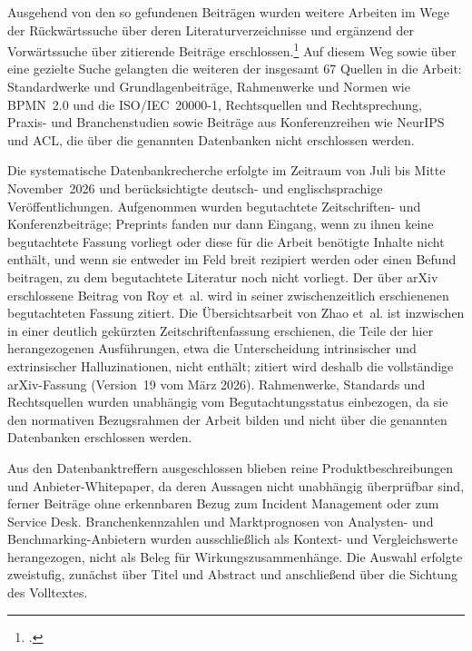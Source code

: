 Ausgehend von den so gefundenen Beitr\"agen wurden weitere Arbeiten im Wege der R\"uckw\"artssuche \"uber deren Literaturverzeichnisse und erg\"anzend der Vorw\"artssuche \"uber zitierende Beitr\"age erschlossen.\footcites[Vgl.][S.~xvi]{Webster2002}[][o.~S.]{VomBrocke2009} Auf diesem Weg sowie \"uber eine gezielte Suche gelangten die weiteren der insgesamt 67 Quellen in die Arbeit: Standardwerke und Grundlagenbeitr\"age, Rahmenwerke und Normen wie BPMN~2.0 und die ISO/IEC~20000-1, Rechtsquellen und Rechtsprechung, Praxis- und Branchenstudien sowie Beitr\"age aus Konferenzreihen wie NeurIPS und ACL, die \"uber die genannten Datenbanken nicht erschlossen werden.

Die systematische Datenbankrecherche erfolgte im Zeitraum von Juli bis Mitte November~2026 und ber\"ucksichtigte deutsch- und englischsprachige Ver\"offentlichungen. Aufgenommen wurden begutachtete Zeitschriften- und Konferenzbeitr\"age; Preprints fanden nur dann Eingang, wenn zu ihnen keine begutachtete Fassung vorliegt oder diese f\"ur die Arbeit ben\"otigte Inhalte nicht enth\"alt, und wenn sie entweder im Feld breit rezipiert werden oder einen Befund beitragen, zu dem begutachtete Literatur noch nicht vorliegt. Der \"uber arXiv erschlossene Beitrag von Roy et~al. wird in seiner zwischenzeitlich erschienenen begutachteten Fassung zitiert. Die \"Ubersichtsarbeit von Zhao et~al. ist inzwischen in einer deutlich gek\"urzten Zeitschriftenfassung erschienen, die Teile der hier herangezogenen Ausf\"uhrungen, etwa die Unterscheidung intrinsischer und extrinsischer Halluzinationen, nicht enth\"alt; zitiert wird deshalb die vollst\"andige arXiv-Fassung (Version~19 vom M\"arz 2026). Rahmenwerke, Standards und Rechtsquellen wurden unabh\"angig vom Begutachtungsstatus einbezogen, da sie den normativen Bezugsrahmen der Arbeit bilden und nicht \"uber die genannten Datenbanken erschlossen werden.

Aus den Datenbanktreffern ausgeschlossen blieben reine Produktbeschreibungen und Anbieter-Whitepaper, da deren Aussagen nicht unabh\"angig \"uberpr\"ufbar sind, ferner Beitr\"age ohne erkennbaren Bezug zum Incident Management oder zum Service Desk. Branchenkennzahlen und Marktprognosen von Analysten- und Benchmarking-Anbietern wurden ausschlie{\ss}lich als Kontext- und Vergleichswerte herangezogen, nicht als Beleg f\"ur Wirkungszusammenh\"ange. Die Auswahl erfolgte zweistufig, zun\"achst \"uber Titel und Abstract und anschlie{\ss}end \"uber die Sichtung des Volltextes.

